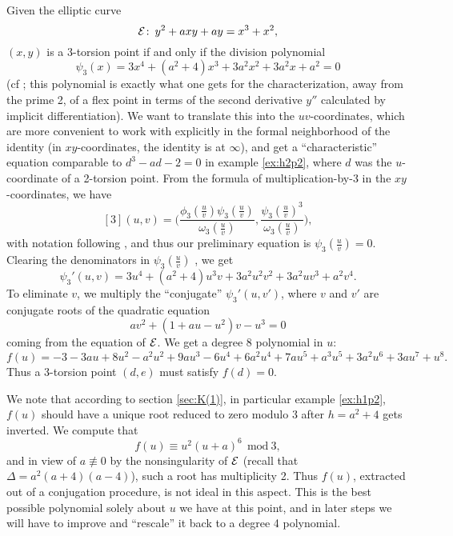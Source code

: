 \documentclass{gtpart}
\theoremstyle{definition}
\theoremstyle{remark}
\def\co{\colon\thinspace}
\begin{document}
Given the elliptic curve 
\[
 {\cal E}\co y^2 + a x y + a y = x^3 + x^2,
\]
$(x,y)$ is a 3-torsion point 
if and only if the division polynomial 
\[
 \psi_3 (x) = 3x^4 + (a^2 + 4) x^3 + 3a^2 x^2 + 3a^2 x + a^2 = 0
\]
(cf \cite[exercise 3.7(d)]{AEC}; this polynomial is exactly what one gets for the 
characterization, away from the prime 2, of a flex point in terms of the second 
derivative $y''$ calculated by implicit differentiation).  We want to translate this into the $uv$-coordinates, 
which are more convenient to work with explicitly in the formal neighborhood of the identity 
(in $xy$-coordinates, the identity is at $\infty$), and get a ``characteristic'' equation 
comparable to $d^3 - a d - 2 = 0$ in example \ref{ex:h2p2}, where $d$ was the $u$-coordinate of a 2-torsion point.  
From the formula of multiplication-by-3 in the $xy$-coordinates, we have
\[
 [3](u,v) = \big(\frac{\phi_3(\frac{u}{v})\psi_3(\frac{u}{v})}{\omega_3(\frac{u}{v})},\frac{\psi_3(\frac{u}{v})^3}{\omega_3(\frac{u}{v})}\big),
\]
with notation following \cite[exercise 3.7(d)]{AEC}, and thus our preliminary equation is $\psi_3(\frac{u}{v}) = 0$.  
Clearing the denominators in $\psi_3(\frac{u}{v})$ , we get 
\[
 \psi_3'(u,v) = 3u^4 + (a^2 + 4) u^3 v + 3a^2 u^2 v^2 + 3a^2 u v^3 + a^2 v^4.
\]
To eliminate $v$, we multiply the ``conjugate'' $\psi_3'(u,v')$, where $v$ and $v'$ are conjugate roots of the quadratic equation 
\[
 a v^2 + (1 + a u - u^2) v - u^3 = 0
\]
coming from the equation of $\cal E$.  
We get a degree 8 polynomial in $u$:
\[
 f(u) = -3 - 3 a u + 8 u^2 - a^2 u^2 + 9 a u^3 - 6 u^4 + 6 a^2 u^4 + 7 a u^5 +
  a^3 u^5 + 3 a^2 u^6 + 3 a u^7 + u^8.
\]
Thus a 3-torsion point $(d,e)$ must satisfy $f(d) = 0$.  

We note that according to section \ref{sec:K(1)}, in particular example \ref{ex:h1p2}, 
$f(u)$ should have a unique root reduced to zero modulo 3 after $h = a^2 + 4$ gets inverted.  
We compute that 
\[
 f(u) \equiv u^2 (u + a)^6~~\text{mod}~3,
\]
and in view of $a \not\equiv 0$ by the nonsingularity 
of $\cal E$ (recall that $\Delta = a^2(a + 4)(a - 4)$), such a root has multiplicity 2.  
Thus $f(u)$, extracted out of a conjugation procedure, is not ideal in this aspect.  This is the best 
possible polynomial solely about $u$ we have at this point, and in later steps we will have to improve and ``rescale'' it back to a degree 4 polynomial.  
\end{document}
